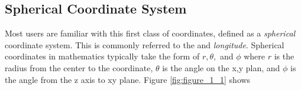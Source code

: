 %


\subsection*{Spherical Coordinate System}

Most users are familiar with this first class of coordinates, defined as a \emph{spherical}
coordinate system.  This is commonly referred to the  and \emph{longitude}.
Spherical coordinates in mathematics typically take the form of $r, \theta,$ and $\phi$ where
$r$ is the radius from the center to the coordinate, $\theta$ is the angle on the x,y plan,
and $\phi$ is the angle from the z axis to xy plane.  Figure \ref{fig:figure_1_1} shows


